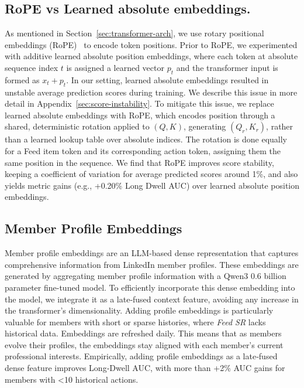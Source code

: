 \documentclass[sigconf]{acmart}
\newcommand{\systemname}{\textit{Feed SR}}
\begin{document}
\subsection{RoPE vs Learned absolute embeddings.}\label{sec:rope}
As mentioned in Section~\ref{sec:transformer-arch}, we use rotary positional embeddings (RoPE)~\cite{su2024roformer} to encode token positions. Prior to RoPE, we experimented with additive learned absolute position embeddings, where each token at absolute sequence index $t$ is assigned a learned vector $p_t$ and the transformer input is formed as $x_t + p_t$. In our setting, learned absolute embeddings resulted in unstable average prediction scores during training. We describe this issue in more detail in Appendix~\ref{sec:score-instability}. To mitigate this issue, we replace learned absolute embeddings with RoPE, which encodes position through a shared, deterministic rotation applied to $(Q,K)$, generating $(Q_{r}, K_{r})$, rather than a learned lookup table over absolute indices. The rotation is done equally for a Feed item token and its corresponding action token, assigning them the same position in the sequence. We find that RoPE improves score stability, keeping a coefficient of variation for average predicted scores around 1\%, and also yields metric gains (e.g., +0.20\% Long Dwell AUC) over learned absolute position embeddings.


\subsection{Member Profile Embeddings}\label{sec:member-profile-embed}
Member profile embeddings are an LLM-based dense representation that captures comprehensive information from LinkedIn member profiles. These embeddings are generated by aggregating member profile information with a Qwen3 0.6 billion parameter \cite{yang2025qwen3} fine-tuned model. To efficiently incorporate this dense embedding into the model, we integrate it as a late‑fused context feature, avoiding any increase in the transformer’s dimensionality.
Adding profile embeddings is particularly valuable for members with short or sparse histories, where {\systemname} lacks historical data. Embeddings are refreshed daily. This means that as members evolve their profiles, the embeddings stay aligned with each member's current professional interests. Empirically, adding profile embeddings as a late‑fused dense feature improves Long‑Dwell AUC, with  more than +2\% AUC gains for members with <10 historical actions.
\end{document}
